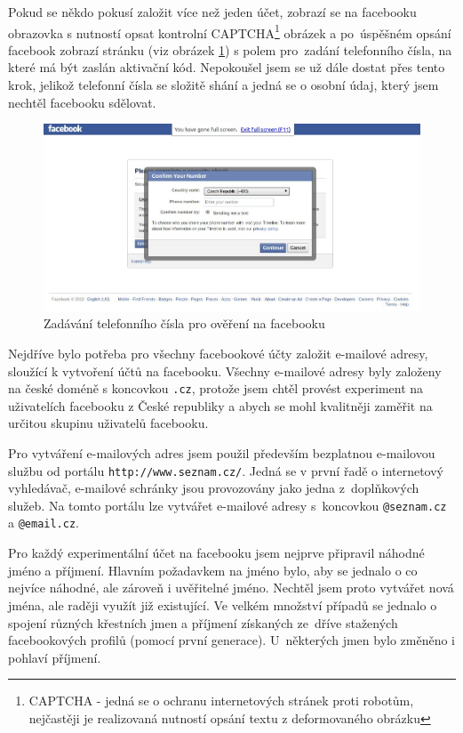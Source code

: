 \documentclass[thesis=M,czech]{FITthesis}[2013/05/10]
\begin{document}
Pokud se někdo pokusí založit více než jeden účet, zobrazí se na facebooku obrazovka s nutností opsat kontrolní CAPTCHA\footnote{CAPTCHA - jedná se o ochranu internetových stránek proti robotům, nejčastěji je realizovaná nutností opsání textu z deformovaného obrázku} obrázek a po~úspěšném opsání facebook zobrazí stránku (viz obrázek \ref{fig:fbTelephoneNubmer}) s polem pro~zadání telefonního čísla, na které má být zaslán aktivační kód. Nepokoušel jsem se už dále dostat přes tento krok, jelikož telefonní čísla se složitě shání a jedná se o osobní údaj, který jsem nechtěl facebooku sdělovat.

\begin{figure}[h]
\begin{center}
\includegraphics[width=5in]{figures/fb-telephone-number2.jpg}
\caption{Zadávání telefonního čísla pro ověření na facebooku}
\label{fig:fbTelephoneNubmer}
\end{center}
\end{figure}

Nejdříve bylo potřeba pro všechny facebookové účty založit e-mailové adresy, sloužící k vytvoření účtů na facebooku. Všechny e-mailové adresy byly založeny na české doméně s koncovkou \verb|.cz|, protože jsem chtěl provést experiment na uživatelích facebooku z České republiky a abych se mohl kvalitněji zaměřit na určitou skupinu uživatelů facebooku. 

Pro vytváření e-mailových adres jsem použil především bezplatnou e-mailovou službu od portálu \verb|http://www.seznam.cz/|. Jedná se v první řadě o internetový vyhledávač, e-mailové schránky jsou provozovány jako jedna z~doplňkových služeb. Na tomto portálu lze vytvářet e-mailové adresy s~koncovkou \verb|@seznam.cz| a \verb|@email.cz|.

Pro každý experimentální účet na facebooku jsem nejprve připravil náhodné jméno a příjmení. Hlavním požadavkem na jméno bylo, aby se jednalo o co nejvíce náhodné, ale zároveň i uvěřitelné jméno. Nechtěl jsem proto vytvářet nová jména, ale raději využít již existující. Ve velkém množství případů se jednalo o spojení různých křestních jmen a příjmení získaných ze~dříve stažených facebookových profilů (pomocí první generace). U~některých jmen bylo změněno i pohlaví příjmení. 
\end{document}
